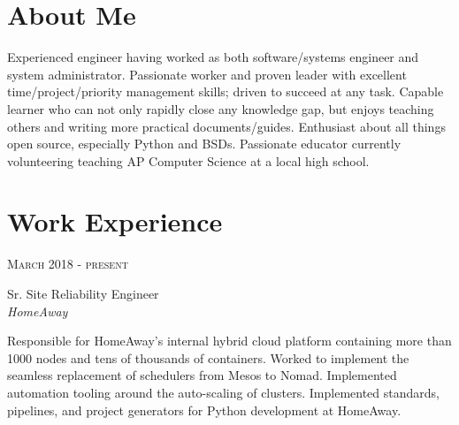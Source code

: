\documentclass[10pt]{article} %
\begin{document}
\begin{minipage}[t]{0.5\textwidth} %
\vspace{0pt} %
	
\section{About Me}
Experienced engineer having worked as both software/systems engineer and system administrator. Passionate worker and proven leader with excellent time/project/priority management skills; driven to succeed at any task. Capable learner who can not only rapidly close any knowledge gap, but enjoys teaching others and writing more practical documents/guides. Enthusiast about all things open source, especially Python and BSDs. Passionate educator currently volunteering teaching AP Computer Science at a local high school.


\section{Work Experience} 


{\raggedleft\textsc{March 2018 - present}\par}

{\raggedright\large Sr. Site Reliability Engineer\\
\textit{HomeAway}\\[5pt]}

\normalsize{Responsible for HomeAway's internal hybrid cloud platform containing more than 1000 nodes and tens of thousands of containers. Worked to implement the seamless replacement of schedulers from Mesos to Nomad. Implemented automation tooling around the auto-scaling of clusters. Implemented standards, pipelines, and project generators for Python development at HomeAway.}\\



\end{minipage}
\end{document}
